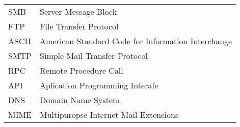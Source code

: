 
\seznamzkr

\begin{tabular}{ll}
	SMB		& Server Message Block\\	
	FTP		& File Transfer Protocol\\
	ASCII	& American Standard Code for Information Interchange\\
	SMTP		& Simple Mail Transfer Protocol\\
	RPC		& Remote Procedure Call\\
	API 		& Aplication Programming Interafe\\
	DNS		& Domain Name System \\
	MIME		& Multipuropse Internet Mail Extensions\\

\end{tabular}

